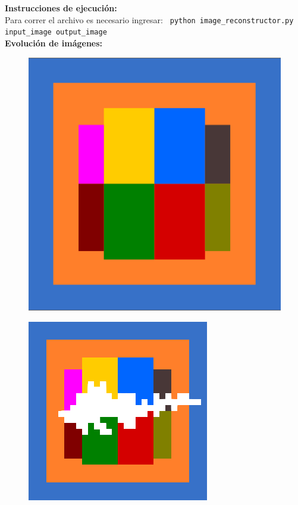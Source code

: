 \documentclass[letterpaper,10.7pt]{article}
\newcommand{\hlc}[2][yellow]{ \colorbox{#1}{#2} }
\begin{document}
{\centering \textbf{{\large Instrucciones de ejecución:}}}
\\
Para correr el archivo es necesario ingresar: \hlc[almond]{\texttt{ python image\_reconstructor.py input\_image output\_image } }\\

{\centering \textbf{{\large Evolución de imágenes:}}}
\\

\begin{figure}[!htb]
   \begin{minipage}[h]{0.3\linewidth}
  \centering
  \includegraphics[scale=0.35]{images/tarea3/original_photo.png}
  \label{fig:colores1}
\end{minipage}
\hfill
   \begin{minipage}[h]{0.3\textwidth}
     \centering
  \includegraphics[scale=0.40]{images/tarea3/or_ph_with_err.png}

\end{minipage}
\end{figure}
\end{document}
